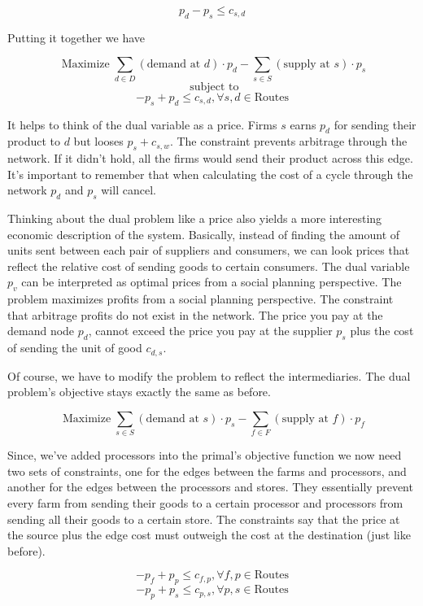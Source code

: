 \documentclass{report}
\begin{document}
$$ p_d -p_s  \leq c_{s,d}$$

Putting it together we have

$$\operatorname{Maximize} \sum_{d \in D}  (\text{demand at } d) \cdot p_{d} -   \sum_{s \in S}  (\text{supply at } s) \cdot p_{s} $$
$$ \text{ subject to}$$
$$ -p_s + p_d \leq c_{s,d}, \forall s,d\in \textrm{Routes}$$


It helps to think of the dual variable as a price. Firms $s$ earns $p_d$ for sending their product to $d$ but looses $p_s + c_{s,w}$. The constraint prevents arbitrage through the network. If it didn't hold, all the firms would send their product across this edge. It's important to remember that when calculating the cost of a cycle through the network $p_d$ and $p_s$ will cancel. 

Thinking about the dual problem like a price also yields a more interesting economic description of the system. Basically, instead of finding the amount of units sent between each pair of suppliers and consumers, we can look prices that reflect the relative cost of sending goods to certain consumers. The dual variable $p_v$ can be interpreted as optimal prices from a social planning perspective. The problem maximizes profits from a social planning perspective. The constraint that arbitrage profits do not exist in the network. The price you pay at the demand node $p_d$, cannot exceed the price you pay at the supplier $p_s$ plus the cost of sending the unit of good $c_{d,s}$.

Of course, we have to modify the problem to reflect the intermediaries. The dual problem's objective stays exactly the same as before.

$$\operatorname{Maximize} \sum_{s \in S}  (\text{demand at } s) \cdot p_{s} -   \sum_{f \in F}  (\text{supply at } f) \cdot p_{f} $$

Since, we've added processors into the primal's objective function we now need two sets of constraints, one for the edges between the farms and processors, and another for the edges between the processors and stores. They essentially prevent every farm from sending their goods to a certain processor and processors from sending all their goods to a certain store. The constraints say that the price at the source plus the edge cost must outweigh the cost at the destination (just like before).

$$ -p_f + p_p \leq c_{f,p}, \forall f,p\in \textrm{Routes}$$
$$ -p_p + p_s \leq c_{p,s}, \forall p,s\in \textrm{Routes}$$
\end{document}
